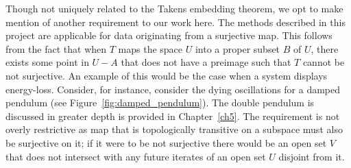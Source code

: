 

Though not uniquely related to the Takens embedding theorem, we opt to make mention of another requirement to our work here. 
The methods described in this project are applicable for data originating from a surjective map. 
This follows from the fact that when $T$ maps the space $U$ into a proper subset $B$ of $U$, there exists some point in $U - A$ that does not have a preimage such that $T$ cannot be not surjective. 
An example of this would be the case when a system displays energy-loss. Consider, for instance, consider the dying oscillations for a damped pendulum (see Figure~\ref{fig:damped_pendulum}). The double pendulum is discussed in greater depth  is provided in Chapter~\ref{ch5}.
The requirement is not overly restrictive as map that is topologically transitive on a subspace must also be surjective on it; if it were to be not surjective there would be an open set $V$ that does not intersect with any future iterates of an open set  $U$ disjoint from it.

